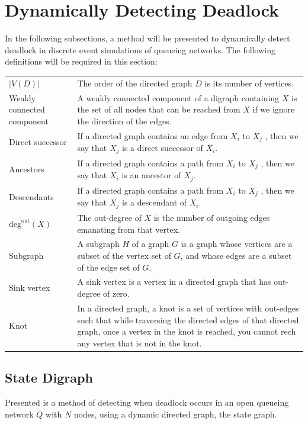 \documentclass{article}
\begin{document}
\section{Dynamically Detecting Deadlock}
In the following subsections, a method will be presented to dynamically detect deadlock in discrete event simulations of queueing networks.
The following definitions will be required in this section:

\begin{tabular}{ p{5cm} p{10cm} }
  $\left| V(D) \right|$        & The order of the directed graph $D$ is its number of vertices. \\
  Weakly connected component   & A weakly connected component of a digraph containing $X$ is the set of all nodes that can be reached from $X$ if we ignore the direction of the edges. \\
  Direct successor             & If a directed graph contains an edge from $X_i$ to $X_j$ , then we say that $X_j$ is a direct successor of $X_i$. \\
  Ancestors                    & If a directed graph contains a path from $X_i$ to $X_j$ , then we say that $X_i$ is an ancestor of $X_j$. \\
  Descendants                  & If a directed graph contains a path from $X_i$ to $X_j$ , then we say that $X_j$ is a descendant of $X_i$. \\
  $\text{deg}^{\text{out}}(X)$ & The out-degree of $X$ is the number of outgoing edges emanating from that vertex. \\
  Subgraph                     & A subgraph $H$ of a graph $G$ is a graph whose vertices are a subset of the vertex set of $G$, and whose edges are a subset of the edge set of $G$. \\
  Sink vertex                  & A sink vertex is a vertex in a directed graph that has out-degree of zero.\\
  Knot                         & In a directed graph, a knot is a set of vertices with out-edges such that while traversing the directed edges of that directed graph, once a vertex in the knot is reached, you cannot rech any vertex that is not in the knot.\\
\end{tabular}


\subsection{State Digraph}

Presented is a method of detecting when deadlock occurs in an open queueing network $Q$ with $N$ nodes, using a dynamic directed graph, the state graph.
\end{document}
